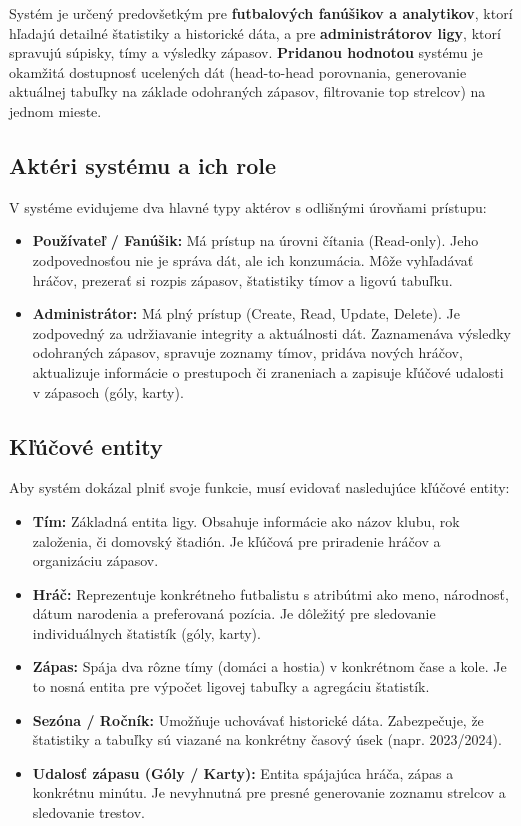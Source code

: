 \documentclass[11pt, a4paper]{article}
\begin{document}
Systém je určený predovšetkým pre \textbf{futbalových fanúšikov a analytikov}, ktorí hľadajú detailné štatistiky a historické dáta, a pre \textbf{administrátorov ligy}, ktorí spravujú súpisky, tímy a výsledky zápasov.
\textbf{Pridanou hodnotou} systému je okamžitá dostupnosť ucelených dát (head-to-head porovnania, generovanie aktuálnej tabuľky na základe odohraných zápasov, filtrovanie top strelcov) na jednom mieste.

\subsection{Aktéri systému a ich role}
V systéme evidujeme dva hlavné typy aktérov s odlišnými úrovňami prístupu:
\begin{itemize}
    \item \textbf{Používateľ / Fanúšik:} Má prístup na úrovni čítania (Read-only). Jeho zodpovednosťou nie je správa dát, ale ich konzumácia. Môže vyhľadávať hráčov, prezerať si rozpis zápasov, štatistiky tímov a ligovú tabuľku.
    \item \textbf{Administrátor:} Má plný prístup (Create, Read, Update, Delete). Je zodpovedný za udržiavanie integrity a aktuálnosti dát. Zaznamenáva výsledky odohraných zápasov, spravuje zoznamy tímov, pridáva nových hráčov, aktualizuje informácie o prestupoch či zraneniach a zapisuje kľúčové udalosti v zápasoch (góly, karty).
\end{itemize}

\subsection{Kľúčové entity}
Aby systém dokázal plniť svoje funkcie, musí evidovať nasledujúce kľúčové entity:
\begin{itemize}
    \item \textbf{Tím:} Základná entita ligy. Obsahuje informácie ako názov klubu, rok založenia, či domovský štadión. Je kľúčová pre priradenie hráčov a organizáciu zápasov.
    \item \textbf{Hráč:} Reprezentuje konkrétneho futbalistu s atribútmi ako meno, národnosť, dátum narodenia a preferovaná pozícia. Je dôležitý pre sledovanie individuálnych štatistík (góly, karty).
    \item \textbf{Zápas:} Spája dva rôzne tímy (domáci a hostia) v konkrétnom čase a kole. Je to nosná entita pre výpočet ligovej tabuľky a agregáciu štatistík.
    \item \textbf{Sezóna / Ročník:} Umožňuje uchovávať historické dáta. Zabezpečuje, že štatistiky a tabuľky sú viazané na konkrétny časový úsek (napr. 2023/2024).
    \item \textbf{Udalosť zápasu (Góly / Karty):} Entita spájajúca hráča, zápas a konkrétnu minútu. Je nevyhnutná pre presné generovanie zoznamu strelcov a sledovanie trestov.
\end{itemize}
\end{document}
